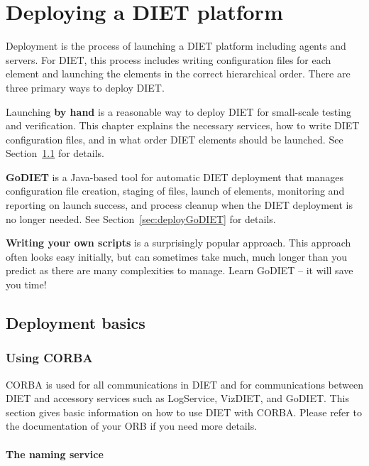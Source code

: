 \chapter{Deploying a DIET platform}
\label{ch:deploying}

Deployment is the process of launching a DIET platform including agents
and servers.  For DIET, this process includes writing configuration
files for each element and launching the elements in the correct
hierarchical order. There are three primary ways to deploy DIET.

Launching \textbf{by hand} is a reasonable way to deploy DIET for
small-scale testing and verification. This chapter explains the 
necessary services, how to write DIET configuration files, and in
what order DIET elements should be launched.  See
Section~\ref{sec:deployBasics} for details.

\textbf{GoDIET} is a Java-based tool for automatic DIET deployment
that manages configuration file creation, staging of files, launch
of elements, monitoring and reporting on launch success, and process
cleanup when the DIET deployment is no longer needed.   See 
Section~\ref{sec:deployGoDIET} for details.

\textbf{Writing your own scripts} is a surprisingly popular
approach.  This approach often looks easy initially, but can
sometimes take much, much longer than you predict as there are many
complexities to manage.  Learn GoDIET -- it will save you time!



\section{Deployment basics}
\label{sec:deployBasics}

\subsection{Using CORBA} 
\label{sec:CORBA_services}

CORBA is used for all communications in DIET and for communications
between DIET and accessory services such as LogService, VizDIET, and
GoDIET.  This section gives basic information on how to use DIET
with CORBA.  Please refer to the documentation of your ORB if you
need more details.

\subsubsection{The naming service}

